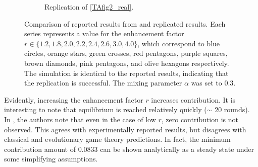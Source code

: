 \begin{figure}[!h]
\begin{subfigure}[b]{0.45\textwidth}
    \caption{Replication of \ref{TAfig2_real}. }
    \label{TAfig2}
  \end{subfigure}
  \caption{Comparison of reported results from \cite{RN49} and replicated results. Each series represents a value for the enhancement factor $r \in \{1.2, 1.8, 2.0, 2.2, 2.4, 2.6, 3.0, 4.0\}$, which correspond to blue circles, orange stars, green crosses, red pentagons, purple squares, brown diamonds, pink pentagons, and olive hexagons respectively. The simulation is identical to the reported results, indicating that the replication is successful. The mixing parameter $\alpha$ was set to 0.3.} \label{comp0}
\end{figure} 
\FloatBarrier

Evidently, increasing the enhancement factor $r$ increases contribution. It is interesting to note that equilibrium is reached relatively quickly ($\sim$ 20 rounds). In \cite{RN49}, the authors note that even in the case of low $r$, zero contribution is not observed. This agrees with experimentally reported results, but disagrees with classical and evolutionary game theory predictions. In fact, the minimum contribution amount of 0.0833 can be shown analytically as a steady state under some simplifying assumptions.


